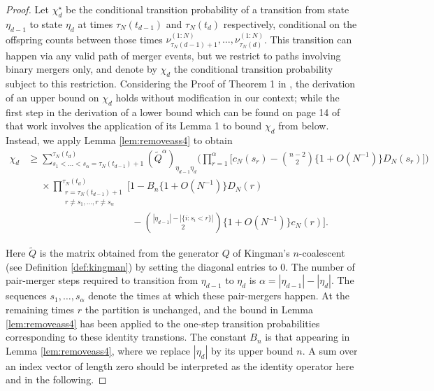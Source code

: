 \documentclass{article}
\theoremstyle{definition}
\newcommand{\1}[1]{\mathbbm{1}_{\{#1\}}}
\begin{document}
\begin{proof}
Let $\chi^\star_d$ be the conditional transition probability of a transition from state $\eta_{d-1}$ to state $\eta_d$ at times $\tau_N(t_{d-1})$ and $\tau_N(t_d)$ respectively, conditional on the offspring counts between those times $\nu^{(1:N)}_{\tau_N(d-1) +1} , \dots, \nu^{(1:N)}_{\tau_N(d)}$. 
This transition can happen via any valid path of merger events, but we restrict to paths involving binary mergers only, and denote by $\chi_d$ the conditional transition probability subject to this restriction.
Considering the Proof of Theorem 1 in \citet{koskela2018}, the derivation of an upper bound on $\chi_d$ holds without modification in our context; while the first step in the derivation of a lower bound which can be found on page 14 of that work involves the application of its Lemma 1 to bound $\chi_d$ from below.
Instead, we apply Lemma \ref{lem:removeass4} to obtain
\begin{align*}
\chi_d &\geq \sum_{ s_1 < \ldots < s_{ \alpha } = \tau_N( t_{ d - 1 } ) + 1 }^{ \tau_N( t_d ) } ( \tilde{ Q }^{ \alpha } )_{ \eta_{ d - 1 } \eta_d } \Bigg( \prod_{ r = 1 }^{ \alpha } \Bigg[ c_N( s_r ) - \binom{ n - 2 }{ 2 } \{ 1+ O( N^{ -1 } ) \} D_N( s_r ) \Bigg] \Bigg) \\
&\phantom{\geq} \times \prod_{ \substack{ r = \tau_N( t_{ d - 1 } ) + 1 \\ r \neq s_1, \ldots, r \neq s_{ \alpha } } }^{ \tau_N( t_d ) } \Bigg[ 1 - B_n \{ 1 + O( N^{ -1 } ) \} D_N( r ) \\
&\phantom{ \geq \times \prod_{ \substack{ r = \tau_N( t_{ d - 1 } ) + 1 \\ r \neq s_1, \ldots, r \neq s_{ \alpha } } }^{ \tau_N( t_d ) } \Bigg[ 1 } - \binom{ | \eta_{ d - 1 } | - | \{ i : s_i < r \} | }{ 2 } \{ 1 + O( N^{ -1 } ) \} c_N( r ) \Bigg] .
\end{align*}
Here $\tilde{Q}$ is the matrix obtained from the generator $Q$ of Kingman's $n$-coalescent (see Definition \ref{def:kingman}) by setting the diagonal entries to 0.
The number of pair-merger steps required to transition from $\eta_{d-1}$ to $\eta_d$ is $\alpha = |\eta_{d-1}| - |\eta_d|$. The sequences $s_1,\dots,s_\alpha$ denote the times at which these pair-mergers happen. 
At the remaining times $r$ the partition is unchanged, and the bound in Lemma \ref{lem:removeass4} has been applied to the one-step transition probabilities corresponding to these identity transtions. The constant $B_n$ is that appearing in Lemma \ref{lem:removeass4}, where we replace $|\eta_d|$ by its upper bound $n$.
A sum over an index vector of length zero should be interpreted as the identity operator here and in the following.


\end{proof}
\end{document}
